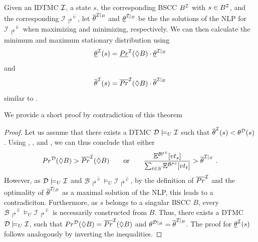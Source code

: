 \begin{theorem}\label{th:max_min_stat_distribution}
    Given an IDTMC $\mathcal{I}$, a state $s$, the corresponding BSCC $B^{\mathcal{I}}$ with $s\in B^{\mathcal{I}}$, and the corresponding $\mathcal{I}\Rsh^{\hat{v}}$, let $\overline{\theta}^{\mathcal{I}|_B}$ and $\underline{\theta}^{\mathcal{I}|_B}$ be the the solutions of the NLP for $\mathcal{I}\Rsh^{\hat{v}}$ when maximizing and minimizing, respectively.
    We can then calculate the minimum and maximum stationary distribution using
    \[\underline{\theta}^{\mathcal{I}}(s) = \underline{Pr}^{\mathcal{I}}(\lozenge B) \cdot \underline{\theta}^{\mathcal{I}|_B}\]
    and 
    \[\overline{\theta}^{\mathcal{I}}(s) = \overline{Pr}^{\mathcal{I}}(\lozenge B) \cdot \overline{\theta}^{\mathcal{I}|_B}\]
    similar to .
\end{theorem}

We provide a short proof by contradiction of this theorem
\begin{proof}
    Let us assume that there exists a DTMC $\mathcal{D} \models_U \mathcal{I}$ such that $\overline{\theta}^{\mathcal{I}}(s) < \theta^{\mathcal{D}}(s)$. Using , , and , we can thus conclude that either
    \[Pr^{\mathcal{D}}(\lozenge B) > \overline{Pr}^{\mathcal{I}}(\lozenge B) \qquad \text{or} \qquad \frac{\mathbb{E}^{\mathcal{B}\Rsh^{\hat{v}}}[vt_s]}{\sum_{t\in S}\mathbb{E}^{\mathcal{B}\Rsh^{\hat{v}}}[vt_t]} > \overline{\theta}^{\mathcal{I}|_B}\ .\]
    However, as $\mathcal{D} \models_U \mathcal{I}$ and $\mathcal{B}\!\Rsh^{\hat{v}} \models_U \mathcal{I}\!\Rsh^{\hat{v}}$, by the definition of $\overline{Pr}^{\mathcal{I}}$ and the optimality of $\overline{\theta}^{\mathcal{I}|_B}$ as a maximal solution of the NLP, this leads to a contradiciton.
    Furthermore, as $s$ belongs to a singular BSCC $B$, every $\mathcal{B}\!\Rsh^{\hat{v}} \models_U \mathcal{I}\!\Rsh^{\hat{v}}$ is necessarily constructed from $B$. Thus, there exists a DTMC $\mathcal{D} \models_U \mathcal{I}$, such that $Pr^{\mathcal{D}}(\lozenge B) = \overline{Pr}^{\mathcal{I}}(\lozenge B)$ and $\theta^{\mathcal{D}|_B} = \overline{\theta}^{\mathcal{I}|_B}$.
    The proof for $\underline{\theta}^{\mathcal{I}}(s)$ follows analogously by inverting the inequalities.
\end{proof}






